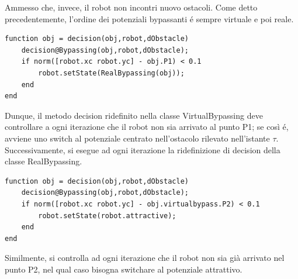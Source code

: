 \documentclass[14pt,a4paper]{extarticle}
\begin{document}
Ammesso che, invece, il robot non incontri nuovo ostacoli. Come detto precedentemente, l'ordine dei potenziali bypassanti é sempre virtuale e poi reale. 
\begin{lstlisting}[caption=Ridefinizione del metodo decision di VirtualBypassing]
function obj = decision(obj,robot,dObstacle)
	decision@Bypassing(obj,robot,dObstacle);
	if norm([robot.xc robot.yc] - obj.P1) < 0.1
		robot.setState(RealBypassing(obj));
	end
end
\end{lstlisting}
Dunque, il metodo decision ridefinito nella classe VirtualBypassing deve controllare a ogni iterazione che il robot non sia arrivato al punto P1; se così é, avviene uno switch al potenziale centrato nell'ostacolo rilevato nell'istante \(\tau\). Successivamente, si esegue ad ogni iterazione la ridefinizione di decision della classe RealBypassing. 
\begin{lstlisting}[caption=Ridefinizione del metodo decision di RealBypassing]
function obj = decision(obj,robot,dObstacle)
	decision@Bypassing(obj,robot,dObstacle);
	if norm([robot.xc robot.yc] - obj.virtualbypass.P2) < 0.1
		robot.setState(robot.attractive);
	end
end
\end{lstlisting}
Similmente, si controlla ad ogni iterazione che il robot non sia già arrivato nel punto P2, nel qual caso bisogna switchare al potenziale attrattivo. \newpage
\end{document}
